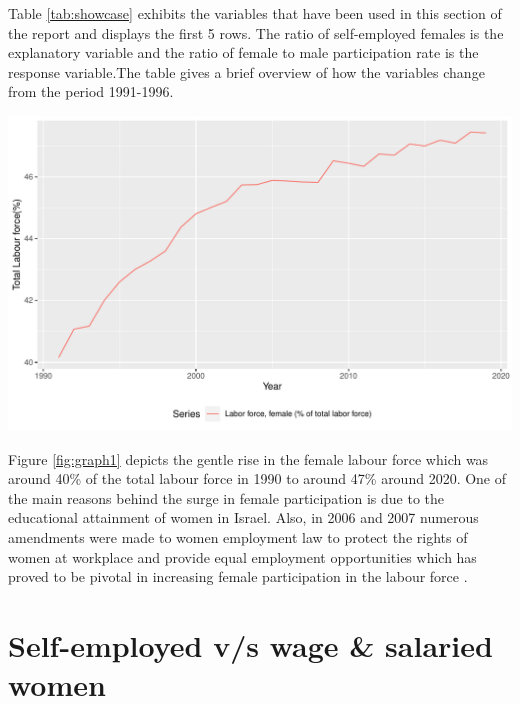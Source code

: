 \documentclass[11pt,a4paper,]{article}
\let\origfigure\figure
\let\endorigfigure\endfigure
\renewenvironment{figure}[1][2] {
    \expandafter\origfigure\expandafter[H]
} {
    \endorigfigure
}%
\begin{document}
Table \ref{tab:showcase} exhibits the variables that have been used in
this section of the report and displays the first 5 rows. The ratio of
self-employed females is the explanatory variable and the ratio of
female to male participation rate is the response variable.The table
gives a brief overview of how the variables change from the period
1991-1996.

\begin{figure}
\centering
\includegraphics{report_files/figure-latex/graph1-1.pdf}
\caption{\label{fig:graph1}\% Female labour force out of total labour force}
\end{figure}

Figure \ref{fig:graph1} depicts the gentle rise in the female labour
force which was around 40\% of the total labour force in 1990 to around
47\% around 2020. One of the main reasons behind the surge in female
participation is due to the educational attainment of women in Israel.
Also, in 2006 and 2007 numerous amendments were made to women employment
law to protect the rights of women at workplace and provide equal
employment opportunities which has proved to be pivotal in increasing
female participation in the labour force
\autocite{israelministryofforeignaffairs2013}.

\section{Self-employed v/s wage \& salaried
women}\label{self-employed-vs-wage-salaried-women}
\end{document}
